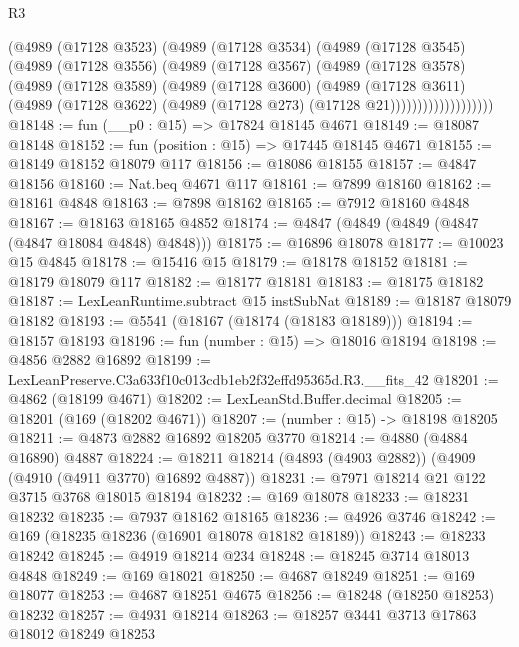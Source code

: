 \begin{lexlean}{R3}
\begin{coremodule}
                  (@4989
                    (@17128 @3523)
                    (@4989
                      (@17128 @3534)
                      (@4989
                        (@17128 @3545)
                        (@4989
                          (@17128 @3556)
                          (@4989
                            (@17128 @3567)
                            (@4989
                              (@17128 @3578)
                              (@4989
                                (@17128 @3589)
                                (@4989
                                  (@17128 @3600)
                                  (@4989
                                    (@17128 @3611)
                                    (@4989
                                      (@17128 @3622)
                                      (@4989 (@17128 @273) (@17128 @21)))))))))))))))))))
@18148 := fun (__p0 : @15) => @17824 @18145 @4671
@18149 := @18087 @18148
@18152 := fun (position : @15) => @17445 @18145 @4671
@18155 := @18149 @18152 @18079 @117
@18156 := @18086 @18155
@18157 := @4847 @18156
@18160 := Nat.beq @4671 @117
@18161 := @7899 @18160
@18162 := @18161 @4848
@18163 := @7898 @18162
@18165 := @7912 @18160 @4848
@18167 := @18163 @18165 @4852
@18174 := @4847 (@4849 (@4849 (@4847 (@4847 @18084 @4848) @4848)))
@18175 := @16896 @18078
@18177 := @10023 @15 @4845
@18178 := @15416 @15
@18179 := @18178 @18152
@18181 := @18179 @18079 @117
@18182 := @18177 @18181
@18183 := @18175 @18182
@18187 := LexLeanRuntime.subtract @15 instSubNat
@18189 := @18187 @18079 @18182
@18193 := @5541 (@18167 (@18174 (@18183 @18189)))
@18194 := @18157 @18193
@18196 := fun (number : @15) => @18016 @18194
@18198 := @4856 @2882 @16892
@18199 := LexLeanPreserve.C3a633f10c013cdb1eb2f32effd95365d.R3.__fits_42
@18201 := @4862 (@18199 @4671)
@18202 := LexLeanStd.Buffer.decimal
@18205 := @18201 (@169 (@18202 @4671))
@18207 := (number : @15) -> @18198 @18205
@18211 := @4873 @2882 @16892 @18205 @3770
@18214 := @4880 (@4884 @16890) @4887
@18224 := @18211 @18214 (@4893 (@4903 @2882)) (@4909 (@4910 (@4911 @3770) @16892 @4887))
@18231 := @7971 @18214 @21 @122 @3715 @3768 @18015 @18194
@18232 := @169 @18078
@18233 := @18231 @18232
@18235 := @7937 @18162 @18165
@18236 := @4926 @3746
@18242 := @169 (@18235 @18236 (@16901 @18078 @18182 @18189))
@18243 := @18233 @18242
@18245 := @4919 @18214 @234
@18248 := @18245 @3714 @18013 @4848
@18249 := @169 @18021
@18250 := @4687 @18249
@18251 := @169 @18077
@18253 := @4687 @18251 @4675
@18256 := @18248 (@18250 @18253) @18232
@18257 := @4931 @18214
@18263 := @18257 @3441 @3713 @17863 @18012 @18249 @18253

\end{coremodule}
\end{lexlean}
